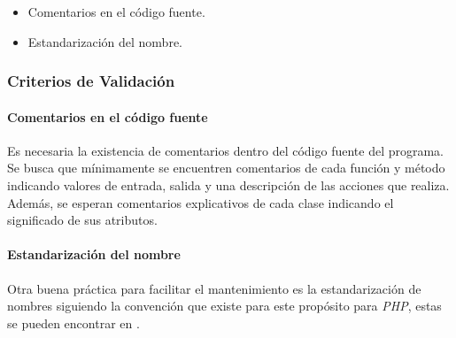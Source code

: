 \begin{itemize}
	\item
	Comentarios en el código fuente.
	\item
	Estandarización del nombre.

\end{itemize}

\subsubsection{Criterios de Validación}

\paragraph{Comentarios en el código fuente\\}

Es necesaria la existencia de comentarios dentro del código fuente del programa. Se busca que mínimamente se encuentren comentarios de cada función y método indicando valores de entrada, salida y una descripción de las acciones que realiza. Además, se esperan comentarios explicativos de cada clase indicando el significado de sus atributos. 

\paragraph{Estandarización del nombre\\}

Otra buena práctica para facilitar el mantenimiento es la estandarización de nombres siguiendo la convención que existe para este propósito para \textit{PHP}, estas se pueden encontrar en \citet{web01}.
